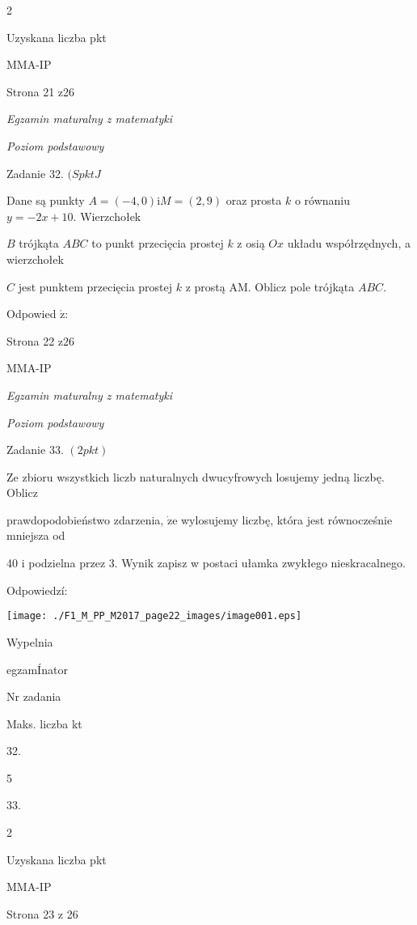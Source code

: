 \documentclass[a4paper,12pt]{article}
\begin{document}
2

Uzyskana liczba pkt

MMA-IP

Strona 21 z26





{\it Egzamin maturalny z matematyki}

{\it Poziom podstawowy}

Zadanie 32. $(SpktJ$

Dane są punkty $A=(-4,0) \mathrm{i}M=(2,9)$ oraz prosta $k$ o równaniu $y=-2x+10$. Wierzchołek

$B$ trójkąta $ABC$ to punkt przecięcia prostej $k$ z osią $Ox$ układu współrzędnych, a wierzchołek

$C$ jest punktem przecięcia prostej $k$ z prostą AM. Oblicz pole trójkąta $ABC.$

Odpowied $\acute{\mathrm{z}}$:

Strona 22 $\mathrm{z}26$

MMA-IP





{\it Egzamin maturalny z matematyki}

{\it Poziom podstawowy}

Zadanie 33. $(2pkt)$

Ze zbioru wszystkich liczb naturalnych dwucyfrowych losujemy jedną liczbę. Oblicz

prawdopodobieństwo zdarzenia, $\dot{\mathrm{z}}\mathrm{e}$ wylosujemy liczbę, która jest równocześnie mniejsza od

40 i podzielna przez 3. Wynik zapisz w postaci ułamka zwykłego nieskracalnego.

Odpowiedzí:
\begin{center}
\texttt{[image: ./F1\_M\_PP\_M2017\_page22\_images/image001.eps]}
\end{center}
Wypelnia

egzamÍnator

Nr zadania

Maks. liczba kt

32.

5

33.

2

Uzyskana liczba pkt

MMA-IP

Strona 23 z 26
\end{document}

